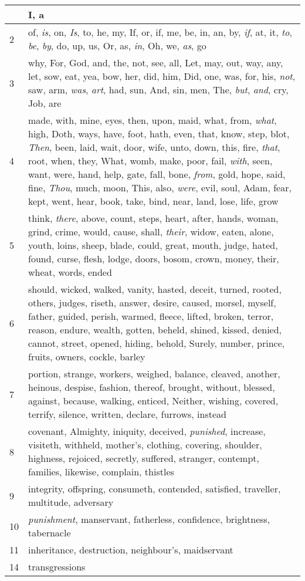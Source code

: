 \begin{longtable}{l|p{3.75in}}
\hline \hline
\endlastfoot
1 & I, a \\ \hline
2 & of, \emph{is}, on, \emph{Is}, to, he, my, If, or, if, me, be, in, an, by, \emph{if}, at, it, \emph{to}, \emph{be}, \emph{by}, do, up, us, Or, as, \emph{in}, Oh, we, \emph{as}, go \\ \hline
3 & why, For, God, and, the, not, see, all, Let, may, out, way, any, let, sow, eat, yea, bow, her, did, him, Did, one, was, for, his, \emph{not}, saw, arm, \emph{was}, \emph{art}, had, sun, And, sin, men, The, \emph{but}, \emph{and}, cry, Job, are \\ \hline
4 & made, with, mine, eyes, then, upon, maid, what, from, \emph{what}, high, Doth, ways, have, foot, hath, even, that, know, step, blot, \emph{Then}, been, laid, wait, door, wife, unto, down, this, fire, \emph{that}, root, when, they, What, womb, make, poor, fail, \emph{with}, seen, want, were, hand, help, gate, fall, bone, \emph{from}, gold, hope, said, fine, \emph{Thou}, much, moon, This, also, \emph{were}, evil, soul, Adam, fear, kept, went, hear, book, take, bind, near, land, lose, life, grow \\ \hline
5 & think, \emph{there}, above, count, steps, heart, after, hands, woman, grind, crime, would, cause, shall, \emph{their}, widow, eaten, alone, youth, loins, sheep, blade, could, great, mouth, judge, hated, found, curse, flesh, lodge, doors, bosom, crown, money, their, wheat, words, ended \\ \hline
6 & should, wicked, walked, vanity, hasted, deceit, turned, rooted, others, judges, riseth, answer, desire, caused, morsel, myself, father, guided, perish, warmed, fleece, lifted, broken, terror, reason, endure, wealth, gotten, beheld, shined, kissed, denied, cannot, street, opened, hiding, behold, Surely, number, prince, fruits, owners, cockle, barley \\ \hline
7 & portion, strange, workers, weighed, balance, cleaved, another, heinous, despise, fashion, thereof, brought, without, blessed, against, because, walking, enticed, Neither, wishing, covered, terrify, silence, written, declare, furrows, instead \\ \hline
8 & covenant, Almighty, iniquity, deceived, \emph{punished}, increase, visiteth, withheld, mother's, clothing, covering, shoulder, highness, rejoiced, secretly, suffered, stranger, contempt, families, likewise, complain, thistles \\ \hline
9 & integrity, offspring, consumeth, contended, satisfied, traveller, multitude, adversary \\ \hline
10 & \emph{punishment}, manservant, fatherless, confidence, brightness, tabernacle \\ \hline
11 & inheritance, destruction, neighbour's, maidservant \\ \hline
14 & transgressions \\ \hline
\end{longtable}






